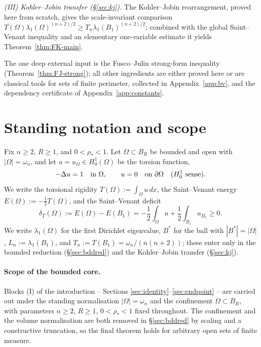 \documentclass[11pt]{amsart}
\theoremstyle{definition}
\newcommand{\Om}{\Omega}
\newcommand{\dT}{\delta_T}
\newcommand{\rstar}{\rho_*}
\newcommand{\Bstar}{B^*}
\begin{document}
\emph{(III) Kohler--Jobin transfer (\S\ref{sec:kj}).}
The Kohler--Jobin rearrangement, proved here from scratch, gives the
scale-invariant comparison \(T(\Om)\lambda_1(\Om)^{(n+2)/2}\ge
T_n\lambda_1(B_1)^{(n+2)/2}\); combined with the global Saint--Venant inequality
and an elementary one-variable estimate it yields Theorem~\ref{thm:FK-main}.

The one deep external input is the Fusco--Julin strong-form inequality
(Theorem~\ref{thm:FJ-strong}); all other ingredients are either proved here or
are classical tools for sets of finite perimeter, collected in
Appendix~\ref{app:bv}, and the dependency certificate of
Appendix~\ref{app:constants}.

\section{Standing notation and scope}\label{sec:notation}

Fix \(n\ge2\), \(R\ge1\), and \(0<\rstar<1\).  Let
\(\Om\subset B_R\) be bounded and open with \(|\Om|=\omega_n\), and let
\(u=u_\Om\in H^1_0(\Om)\) be the torsion function,
\[
   -\Delta u=1\quad\hbox{in }\Om,\qquad u=0\quad\hbox{on }\partial\Om
   \quad(H^1_0\hbox{ sense}).
\]
We write the torsional rigidity \(T(\Om):=\int_\Om u\,dx\), the Saint--Venant
energy \(E(\Om):=-\tfrac12 T(\Om)\), and the Saint--Venant deficit
\[
   \dT(\Om):=E(\Om)-E(B_1)
   =-\frac12\int_\Om u+\frac12\int_{B_1}u_{B_1}\ge0.
\]
We write \(\lambda_1(\Om)\) for the first Dirichlet eigenvalue, \(\Bstar\) for
the ball with \(|\Bstar|=|\Om|\), \(L_n:=\lambda_1(B_1)\), and
\(T_n:=T(B_1)=\omega_n/(n(n+2))\); these enter only in the bounded reduction
(\S\ref{sec:bddred}) and the Kohler--Jobin transfer (\S\ref{sec:kj}).

\paragraph{Scope of the bounded core.}  Blocks (I) of the introduction --
Sections \ref{sec:identity}--\ref{sec:endpoint} -- are carried out under the
standing normalisation \(|\Om|=\omega_n\) and the confinement
\(\Om\subset B_R\), with parameters \(n\ge2\), \(R\ge1\), \(0<\rstar<1\) fixed
throughout.  The confinement and the volume normalisation are both removed in
\S\ref{sec:bddred} by scaling and a constructive truncation, so the final
theorem holds for arbitrary open sets of finite measure.
\end{document}
